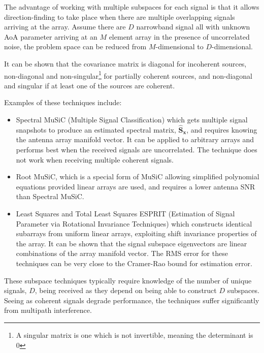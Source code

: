 The advantage of working with multiple subspaces for each signal is that it allows direction-finding to take place when there are multiple overlapping signals arriving at the array. Assume there are \(D\) narrowband signal all with unknown AoA parameter arriving at an \(M\) element array in the presence of uncorrelated noise, the problem space can be reduced from \(M\)-dimensional to \(D\)-dimensional\cite{van2004detection}.

It can be shown that the covariance matrix is diagonal for incoherent sources, non-diagonal and non-singular\footnote{A singular matrix is one which is not invertible, meaning the determinant is 0} for partially coherent sources, and non-diagonal and singular if at least one of the sources are coherent\cite{poisel2012electronic}. 

Examples of these techniques include\cite{van2004detection}:
\begin{itemize}
  \item Spectral MuSiC (Multiple Signal Classification) which gets multiple signal snapshots to produce an estimated spectral matrix, \(\hat{\mathbf{S}}_{\mathbf{x}}\), and requires knowing the antenna array manifold vector. It can be applied to arbitrary arrays and performs best when the received signals are uncorrelated. The technique does not work when receiving multiple coherent signals.
  \item Root MuSiC, which is a special form of MuSiC allowing simplified polynomial equations provided linear arrays are used, and requires a lower antenna SNR than Spectral MuSiC.
  \item Least Squares and Total Least Squares ESPRIT (Estimation of Signal Parameter via Rotational Invariance Techniques) which constructs identical subarrays from uniform linear arrays, exploiting shift invariance properties of the array. It can be shown that the signal subspace eigenvectors are linear combinations of the array manifold vector. The RMS error for these techniques can be very close to the Cramer-Rao bound for estimation error\cite{van2004detection}.
\end{itemize}
These subspace techniques typically require knowledge of the number of unique signals, \(D\), being received as they depend on being able to construct \(D\) subspaces. Seeing as coherent signals degrade performance, the techniques suffer significantly from multipath interference.

